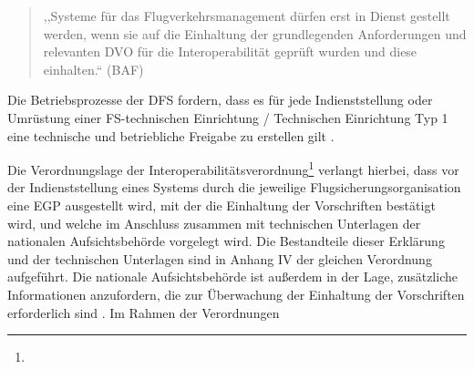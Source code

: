     \begin{quote}
        ,,Systeme für das Flugverkehrsmanagement dürfen erst in Dienst gestellt werden, wenn sie auf die Einhaltung der grundlegenden Anforderungen und relevanten \ac{DVO} für die Interoperabilität geprüft wurden und diese einhalten.``
         (\ac{BAF}) \cite[17]{baf_iop}
    \end{quote}
    
    \noindent
    Die Betriebsprozesse der \ac{DFS} fordern, dass es für jede Indienststellung oder Umrüstung einer FS-technischen Einrichtung / Technischen Einrichtung Typ 1 eine technische und betriebliche Freigabe zu erstellen gilt 
    \cite{fa_freigaben}.

    \medskip
    Die Verordnungslage der Interoperabilitätsverordnung\footnote{} verlangt hierbei, dass vor der Indienststellung eines Systems durch die jeweilige Flugsicherungsorganisation eine \acf{EGP} ausgestellt wird, mit der die Einhaltung der Vorschriften bestätigt wird, und welche im Anschluss zusammen mit technischen Unterlagen der nationalen Aufsichtsbehörde vorgelegt wird. 
    Die Bestandteile dieser Erklärung und der technischen Unterlagen sind in Anhang IV der gleichen Verordnung aufgeführt. 
    Die nationale Aufsichtsbehörde ist außerdem in der Lage, zusätzliche Informationen anzufordern, die zur Überwachung der Einhaltung der Vorschriften erforderlich sind
    \cite[Art. 6 Abs. 2]{2004R0552}.
    Im Rahmen der Verordnungen



    




